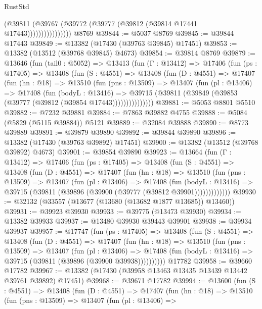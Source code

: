 \begin{lexlean}{RustStd}
\begin{coremodule}
                        (@39811
                          (@39767 (@39772 (@39777 (@39812 (@39814 @17441 @17443))))))))))))))))
    @8769
@39844 := @5037 @8769
@39845 := @39844 @17443
@39849 := @13382 (@17430 (@39763 @39845) @17451)
@39853 := @13382 (@13512 (@39768 @39845) @4673)
@39854 := @39814 @8769
@39879 := @13646
    (fun (tail0 : @5052) =>
    @13413
      (fun (Γ : @13412) =>
      @17406
        (fun (ps : @17405) =>
        @13408
          (fun (S : @4551) =>
          @13408
            (fun (D : @4551) =>
            @17407
              (fun (hn : @18) =>
              @13510
                (fun (pns : @13509) =>
                @13407
                  (fun (pl : @13406) =>
                  @17408
                    (fun (bodyL : @13416) =>
                    @39715 (@39811 (@39849 (@39853 (@39777 (@39812 (@39854 @17443)))))))))))))))
@39881 := @5053 @8801 @5510
@39882 := @7232 @39881
@39884 := @7863 @39882 @4755
@39888 := @5084 (@5829 (@5115 @39884)) @5121
@39889 := @32084 @39888
@39890 := @8773 @39889
@39891 := @39879 @39890
@39892 := @39844 @39890
@39896 := @13382 (@17430 (@39763 @39892) @17451)
@39900 := @13382 (@13512 (@39768 @39892) @4673)
@39901 := @39854 @39890
@39923 := @13664
    (fun (Γ : @13412) =>
    @17406
      (fun (ps : @17405) =>
      @13408
        (fun (S : @4551) =>
        @13408
          (fun (D : @4551) =>
          @17407
            (fun (hn : @18) =>
            @13510
              (fun (pns : @13509) =>
              @13407
                (fun (pl : @13406) =>
                @17408
                  (fun (bodyL : @13416) =>
                  @39715 (@39811 (@39896 (@39900 (@39777 (@39812 @39901)))))))))))))
@39930 := @32132 (@33557 (@13677 (@13680 (@13682 @1877 @13685)) @13460))
@39931 := @39923 @39930
@39933 := @39775 (@13473 @39930)
@39934 := @13382 @39933
@39937 := @13480 @39930 @39443 @39901
@39938 := @39934 @39937
@39957 := @17747
    (fun (ps : @17405) =>
    @13408
      (fun (S : @4551) =>
      @13408
        (fun (D : @4551) =>
        @17407
          (fun (hn : @18) =>
          @13510
            (fun (pns : @13509) =>
            @13407
              (fun (pl : @13406) =>
              @17408 (fun (bodyL : @13416) => @39715 (@39811 (@39896 (@39900 @39938))))))))))
    @17782
@39958 := @39660 @17782
@39967 := @13382 (@17430 (@39958 @13463 @13435 @13439 @13442 @39761 @39892) @17451)
@39968 := @39671 @17782
@39994 := @13600
    (fun (S : @4551) =>
    @13408
      (fun (D : @4551) =>
      @17407
        (fun (hn : @18) =>
        @13510
          (fun (pns : @13509) =>
          @13407
            (fun (pl : @13406) =>

\end{coremodule}
\end{lexlean}
